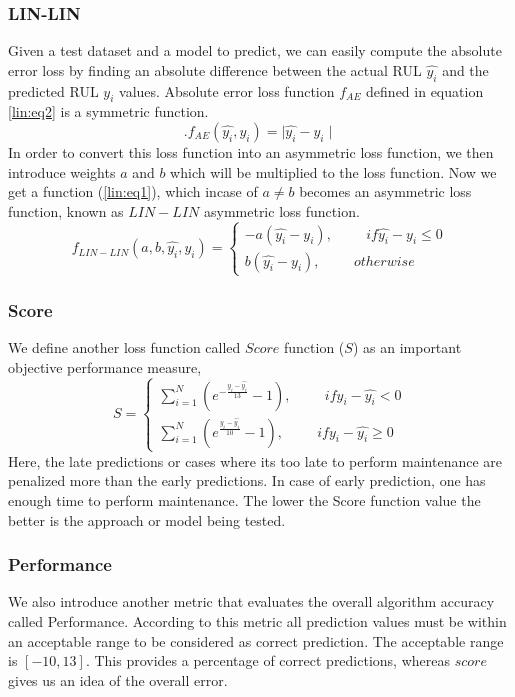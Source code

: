 \subsubsection*{LIN-LIN}
Given a test dataset and a model to predict, we can easily compute the absolute error loss by finding an absolute difference between the actual RUL $\hat{y_{i}}$ and the predicted RUL $y_{i}$ values. Absolute error loss function $f_{AE}$ defined in equation \ref{lin:eq2} is a symmetric function.
\begin{equation} . \label{lin:eq2}
    f_{AE}(\hat{y_{i}},y_{i}) = \mid \hat{y_{i}} - y_{i} \mid
\end{equation}
In order to convert this loss function into an asymmetric loss function, we then introduce weights $a$ and $b$ which will be multiplied to the loss function. Now we get a function (\ref{lin:eq1}), which incase of $a \neq b$ becomes an asymmetric loss function, known as $LIN-LIN$ asymmetric loss function.
\begin{equation} \label{lin:eq1}
    f_{LIN-LIN}(a, b,\hat{y_{i}},y_{i}) = \begin{cases}
        -a(\hat{y_{i}} - y_{i}),\hspace{1cm}if \hat{y_{i}} - y_{i} \leq 0 \\
        b(\hat{y_{i}} - y_{i}),\hspace{1cm}otherwise
    \end{cases}
\end{equation}

\subsubsection*{Score}

We define another loss function called $Score$ function ($S$) as an important objective performance measure,
\begin{equation}
    S = \begin{cases}
        \sum^{N}_{i=1}(e^{-\frac{y_i-\hat{y_i}}{13}}-1),\hspace{1cm} if y_i - \hat{y_i} < 0 \\
        \sum^{N}_{i=1}(e^{\frac{y_i-\hat{y_i}}{10}}-1),\hspace{1cm} if y_i - \hat{y_i} \geq 0
    \end{cases}
\end{equation}
Here, the late predictions or cases where its too late to perform maintenance are penalized more than the early predictions. In case of early prediction, one has enough time to perform maintenance. The lower the Score function value the better is the approach or model being tested.

\subsubsection*{Performance}

We also introduce another metric that evaluates the overall algorithm accuracy called Performance. According to this metric all prediction values must be within an acceptable range to be considered as correct prediction. The acceptable range is $[-10, 13]$. This provides a percentage of correct predictions, whereas $score$ gives us an idea of the overall error.